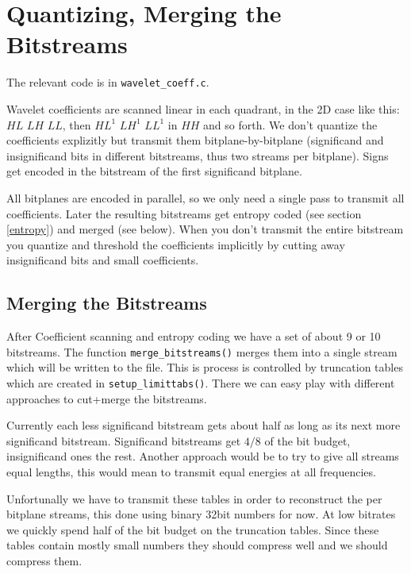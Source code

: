 
\section{ Quantizing, Merging the Bitstreams }

The relevant code is in \verb|wavelet_coeff.c|.

Wavelet coefficients are scanned linear in each quadrant, in the 2D case like
this: $HL$ $LH$ $LL$, then $HL^1$ $LH^1$ $LL^1$ in $HH$ and so forth.
We don't quantize the coefficients explizitly but transmit
them bitplane-by-bitplane (significand and insignificand bits in different
bitstreams, thus two streams per bitplane). Signs get encoded in the bitstream
of the first significand bitplane.

All bitplanes are encoded in parallel, so we only need a single pass to
transmit all coefficients. Later the resulting bitstreams get entropy coded
(see section \ref{entropy}) and merged (see below).
When you don't transmit the entire bitstream you quantize and threshold the
coefficients implicitly by cutting away insignificand bits and small
coefficients.


\subsection { Merging the Bitstreams }

After Coefficient scanning and entropy coding we have a set of about 9 or 10
bitstreams. The function \verb|merge_bitstreams()| merges them into a single
stream which will be written to the file.
This is process is controlled by truncation tables which are created in
\verb|setup_limittabs()|. There we can easy play with different approaches to
cut+merge the bitstreams.

Currently each less significand bitstream gets about half as long as its 
next more significand bitstream. Significand bitstreams get $4/8$ of the
bit budget, insignificand ones the rest.
Another approach would be to try to give all streams equal lengths, this
would mean to transmit equal energies at all frequencies.

Unfortunally we have to transmit these tables in order to reconstruct the per
bitplane streams, this done using binary 32bit numbers for now. At low 
bitrates we quickly spend half of the bit budget on the truncation tables.
Since these tables contain mostly small numbers they should compress well 
and we should compress them.

